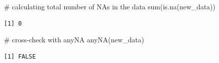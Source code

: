 \documentclass[
  letterpaper,
  DIV=11,
  numbers=noendperiod]{scrartcl}
\newenvironment{Shaded}{\begin{snugshade}}{\end{snugshade}}
\newcommand{\CommentTok}[1]{\textcolor[rgb]{0.37,0.37,0.37}{#1}}
\newcommand{\FunctionTok}[1]{\textcolor[rgb]{0.28,0.35,0.67}{#1}}
\newcommand{\NormalTok}[1]{\textcolor[rgb]{0.00,0.23,0.31}{#1}}
\begin{document}
\begin{Shaded}
\begin{Highlighting}[]
\CommentTok{\# calculating total number of NAs in the data}
\FunctionTok{sum}\NormalTok{(}\FunctionTok{is.na}\NormalTok{(new\_data))}
\end{Highlighting}
\end{Shaded}

\begin{verbatim}
[1] 0
\end{verbatim}

\begin{Shaded}
\begin{Highlighting}[]
\CommentTok{\# cross{-}check with anyNA}
\FunctionTok{anyNA}\NormalTok{(new\_data)}
\end{Highlighting}
\end{Shaded}

\begin{verbatim}
[1] FALSE
\end{verbatim}
\end{document}
